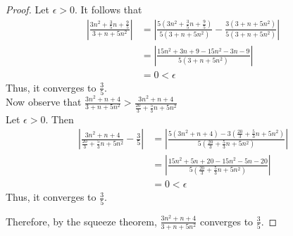 \documentclass{article}
\theoremstyle{problem}
\theoremstyle{plain}
\theoremstyle{remark}
\newcommand{\abs}[1] {
  \left| #1 \right|
}
\begin{document}
\begin{enumerate}
\begin{proof}
Let $\epsilon > 0$.
It follows that
\begin{align*}
  \abs{\frac{3n^2+\frac{3}{5}n+\frac{9}{5}}{3 + n + 5n^2}} &= \abs{\frac{5(3n^2+\frac{3}{5}n+\frac{9}{5})}{5(3 + n + 5n^2)} - \frac{3(3 + n + 5n^2)}{5(3 + n + 5n^2)}}\\
  &= \abs{\frac{15n^2 + 3n + 9 - 15n^2 - 3n - 9}{5(3 + n + 5n^2)}}\\
  &= 0 < \epsilon
\end{align*}
Thus, it converges to $\displaystyle \frac{3}{5}$.\\[.5cm]
Now observe that $\displaystyle \frac{3n^2+n+4}{3 + n + 5n^2} > \frac{3n^2+n+4}{\frac{20}{3} + \frac{5}{3}n + 5n^2}$\\[.5cm]
Let $\epsilon > 0$. Then
\begin{align*}
\abs{\frac{3n^2+n+4}{\frac{20}{3} + \frac{5}{3}n + 5n^2} - \frac{3}{5}} &= \abs{\frac{5(3n^2 + n + 4) - 3(\frac{20}{3} + \frac{5}{3}n + 5n^2)}{5(\frac{20}{3} + \frac{5}{3}n + 5n^2)}}\\
&= \abs{\frac{15n^2 + 5n + 20 - 15n^2 - 5n - 20}{5(\frac{20}{3} + \frac{5}{3}n + 5n^2)}}\\
&= 0 < \epsilon
\end{align*}
Thus, it converges to $\displaystyle \frac{3}{5}$.

Therefore, by the squeeze theorem, $\displaystyle \frac{3n^2+n+4}{3 + n + 5n^2}$ converges to $\displaystyle \frac{3}{5}$.

\end{proof}

\end{enumerate}
\end{document}
